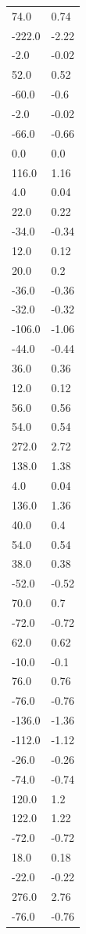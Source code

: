 \begin{longtable}{ll}
74.0 & 0.74 \\
-222.0 & -2.22 \\
-2.0 & -0.02 \\
52.0 & 0.52 \\
-60.0 & -0.6 \\
-2.0 & -0.02 \\
-66.0 & -0.66 \\
0.0 & 0.0 \\
116.0 & 1.16 \\
4.0 & 0.04 \\
22.0 & 0.22 \\
-34.0 & -0.34 \\
12.0 & 0.12 \\
20.0 & 0.2 \\
-36.0 & -0.36 \\
-32.0 & -0.32 \\
-106.0 & -1.06 \\
-44.0 & -0.44 \\
36.0 & 0.36 \\
12.0 & 0.12 \\
56.0 & 0.56 \\
54.0 & 0.54 \\
272.0 & 2.72 \\
138.0 & 1.38 \\
4.0 & 0.04 \\
136.0 & 1.36 \\
40.0 & 0.4 \\
54.0 & 0.54 \\
38.0 & 0.38 \\
-52.0 & -0.52 \\
70.0 & 0.7 \\
-72.0 & -0.72 \\
62.0 & 0.62 \\
-10.0 & -0.1 \\
76.0 & 0.76 \\
-76.0 & -0.76 \\
-136.0 & -1.36 \\
-112.0 & -1.12 \\
-26.0 & -0.26 \\
-74.0 & -0.74 \\
120.0 & 1.2 \\
122.0 & 1.22 \\
-72.0 & -0.72 \\
18.0 & 0.18 \\
-22.0 & -0.22 \\
276.0 & 2.76 \\
-76.0 & -0.76 \\

\end{longtable}
